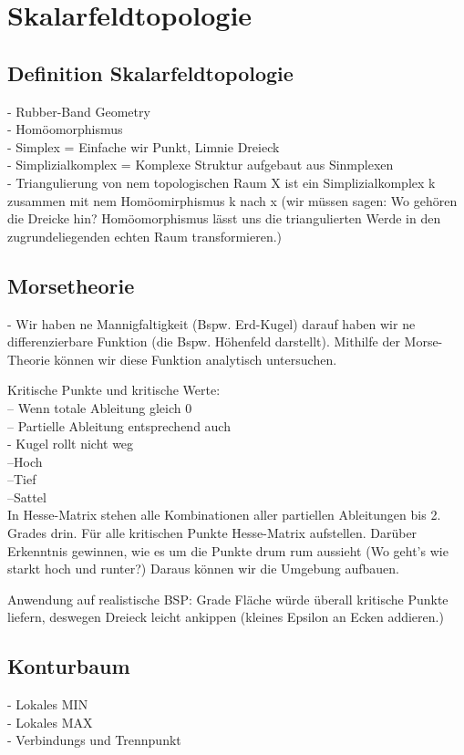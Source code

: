 \documentclass{article}
\begin{document}
\pagebreak
\section{Skalarfeldtopologie}

\subsection{Definition Skalarfeldtopologie}
- Rubber-Band Geometry\\
- Homöomorphismus \\


- Simplex = Einfache wir Punkt, Limnie Dreieck\\
- Simplizialkomplex = Komplexe Struktur aufgebaut aus Sinmplexen\\
- Triangulierung von nem topologischen Raum X ist ein Simplizialkomplex k zusammen mit nem Homöomirphismus k nach x (wir müssen sagen: Wo gehören die Dreicke hin? Homöomorphismus lässt uns die triangulierten Werde in den zugrundeliegenden echten Raum transformieren.)

\subsection{Morsetheorie}
- Wir haben ne Mannigfaltigkeit (Bspw. Erd-Kugel) darauf haben wir ne differenzierbare Funktion (die Bspw. Höhenfeld darstellt). Mithilfe der Morse-Theorie können wir diese Funktion analytisch untersuchen.

Kritische Punkte und kritische Werte:\\
-- Wenn totale Ableitung gleich 0\\
-- Partielle Ableitung entsprechend auch\\
- Kugel rollt nicht weg\\
--Hoch\\
--Tief\\
--Sattel\\

In Hesse-Matrix stehen alle Kombinationen aller partiellen Ableitungen bis 2. Grades drin.
Für alle kritischen Punkte Hesse-Matrix aufstellen. Darüber Erkenntnis gewinnen, wie es um die Punkte drum rum aussieht (Wo geht's wie starkt hoch und runter?) Daraus können wir die Umgebung aufbauen.

Anwendung auf realistische BSP: Grade Fläche würde überall kritische Punkte liefern, deswegen Dreieck leicht ankippen (kleines Epsilon an Ecken addieren.)

\subsection{Konturbaum}
- Lokales MIN\\
- Lokales MAX\\
- Verbindungs und Trennpunkt\\
\end{document}
